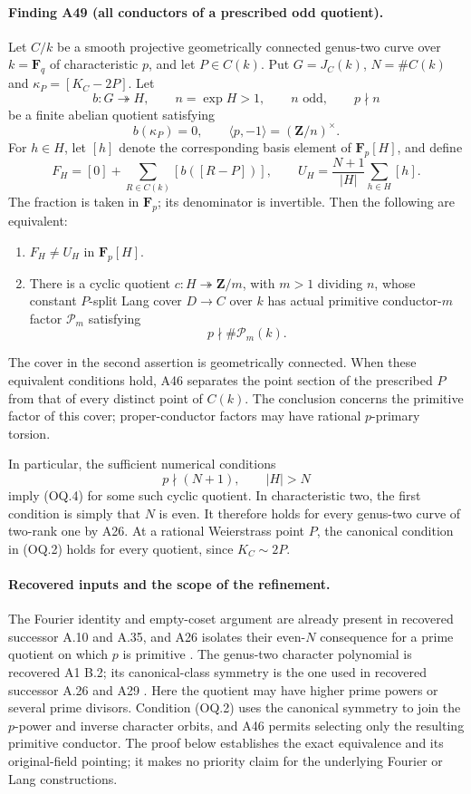\documentclass[11pt,a4paper]{article}
\begin{document}
\paragraph{Finding A49 (all conductors of a prescribed odd quotient).}
Let $C/k$ be a smooth projective geometrically connected genus-two
curve over $k=\mathbf F_q$ of characteristic $p$, and let $P\in C(k)$.
Put $G=J_C(k)$, $N=\#C(k)$ and $\kappa_P=[K_C-2P]$.
Let
\[
 b:G\twoheadrightarrow H,\qquad
 n=\exp H>1,\qquad n\text{ odd},\qquad p\nmid n
 \tag{OQ.1}
\]
be a finite abelian quotient satisfying
\[
 b(\kappa_P)=0,\qquad
       \langle p,-1\rangle=(\mathbf Z/n)^\times.
 \tag{OQ.2}
\]
For $h\in H$, let $[h]$ denote the corresponding basis element of
$\mathbf F_p[H]$, and define
\[
 F_H=[0]+\sum_{R\in C(k)}[b([R-P])],\qquad
 U_H=\frac{N+1}{|H|}\sum_{h\in H}[h].
 \tag{OQ.3}
\]
The fraction is taken in $\mathbf F_p$; its denominator is invertible.
Then the following are equivalent:
\begin{enumerate}
\item $F_H\ne U_H$ in $\mathbf F_p[H]$.
\item There is a cyclic quotient $c:H\twoheadrightarrow\mathbf Z/m$,
      with $m>1$ dividing $n$, whose constant $P$-split Lang cover
      $D\to C$ over $k$ has actual primitive conductor-$m$ factor
      $\mathcal P_m$ satisfying
      \[
                  p\nmid\#\mathcal P_m(k).
       \tag{OQ.4}
      \]
\end{enumerate}
The cover in the second assertion is geometrically connected.
When these equivalent conditions hold, A46 separates the point section of the prescribed $P$
from that of every distinct point of $C(k)$.
The conclusion concerns the primitive factor of this cover;
proper-conductor factors may have rational $p$-primary torsion.

In particular, the sufficient numerical conditions
\[
                 p\nmid(N+1),\qquad |H|>N
 \tag{OQ.5}
\]
imply (OQ.4) for some such cyclic quotient. In characteristic two,
the first condition is simply that $N$ is even. It therefore holds
for every genus-two curve of two-rank one by A26.
At a rational Weierstrass point $P$, the canonical condition in
(OQ.2) holds for every quotient, since $K_C\sim2P$.

\paragraph{Recovered inputs and the scope of the refinement.}
The Fourier identity and empty-coset argument are already present
in recovered successor A.10 and A.35, and A26 isolates their
even-$N$ consequence for a prime quotient on which $p$ is primitive
\cite[A.10, A.35]{ASrun}. The genus-two character polynomial is
recovered A1 B.2; its canonical-class symmetry is the one used in
recovered successor A.26 and A29 \cite[B.2]{A1run}\cite[A.26]{ASrun}.
Here the quotient may have higher prime powers or several prime
divisors. Condition (OQ.2) uses the canonical symmetry to join the
$p$-power and inverse character orbits, and A46 permits selecting
only the resulting primitive conductor. The proof below establishes
the exact equivalence and its original-field pointing; it makes no
priority claim for the underlying Fourier or Lang constructions.
\end{document}
